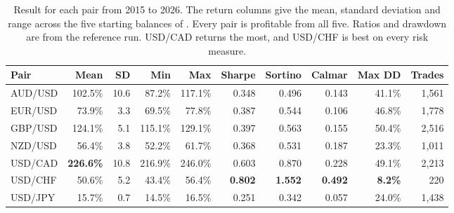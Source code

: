 \begin{table}[htb!]
\centering
\footnotesize
\caption{Result for each pair from 2015 to 2026. The return columns give the mean, standard deviation and range across the five starting balances of . Every pair is profitable from all five. Ratios and drawdown are from the reference run. USD/CAD returns the most, and USD/CHF is best on every risk measure.}
\label{Tables:PairResults}
\begin{tabular}{@{}lrrrrrrrrr@{}}
\toprule
\textbf{Pair} & \textbf{Mean} & \textbf{SD} & \textbf{Min} & \textbf{Max} & \textbf{Sharpe} & \textbf{Sortino} & \textbf{Calmar} & \textbf{Max DD} & \textbf{Trades} \\
\midrule
AUD/USD & 102.5\% & 10.6 & 87.2\% & 117.1\% & 0.348 & 0.496 & 0.143 & 41.1\% & 1,561 \\
EUR/USD & 73.9\% & 3.3 & 69.5\% & 77.8\% & 0.387 & 0.544 & 0.106 & 46.8\% & 1,778 \\
GBP/USD & 124.1\% & 5.1 & 115.1\% & 129.1\% & 0.397 & 0.563 & 0.155 & 50.4\% & 2,516 \\
NZD/USD & 56.4\% & 3.8 & 52.2\% & 61.7\% & 0.368 & 0.531 & 0.187 & 23.3\% & 1,011 \\
USD/CAD & \textbf{226.6\%} & 10.8 & 216.9\% & 246.0\% & 0.603 & 0.870 & 0.228 & 49.1\% & 2,213 \\
USD/CHF & 50.6\% & 5.2 & 43.4\% & 56.4\% & \textbf{0.802} & \textbf{1.552} & \textbf{0.492} & \textbf{8.2\%} & 220 \\
USD/JPY & 15.7\% & 0.7 & 14.5\% & 16.5\% & 0.251 & 0.342 & 0.057 & 24.0\% & 1,438 \\
\bottomrule
\end{tabular}
\end{table}